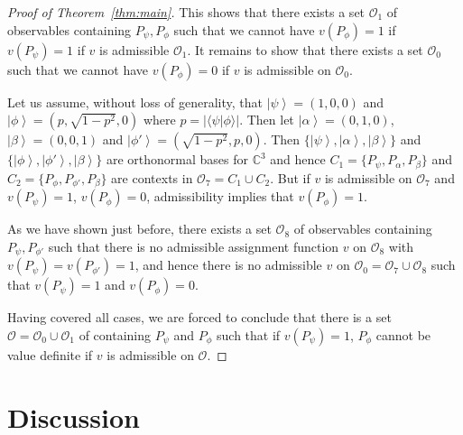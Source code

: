 \documentclass[%
 superscriptaddress,
 preprint,
 showpacs,
 showkeys,
 nofootinbib,
  amsmath,amssymb,
  aps,
  longbibliography,
  floatfix,
 ]{revtex4-1}
\theoremstyle{definition}
\newcommand{\C}{\mathbb{C}}
\newcommand{\ket}[1]{\left| #1 \right>}
\newcommand{\iprod}[2]{\langle #1 | #2 \rangle}
\begin{document}
\begin{proof}[Proof of Theorem~\ref{thm:main}]
	This shows that there exists a set $\mathcal{O}_1$ of observables containing $P_\psi,P_\phi$ such that we cannot have $v(P_\phi)=1$ if $v(P_\psi)=1$ if $v$ is admissible $\mathcal{O}_1$.
	It remains to show that there exists a set $\mathcal{O}_0$ such that we cannot have $v(P_\phi)=0$ if $v$ is admissible on $\mathcal{O}_0$.
	
	Let us assume, without loss of generality, that $\ket{\psi}=(1,0,0)$ and $\ket{\phi}=(p,\sqrt{1-p^2},0)$ where $p=|\iprod{\psi}{\phi}|$.
	Then let $\ket{\alpha}=(0,1,0)$, $\ket{\beta}=(0,0,1)$ and $\ket{\phi'}=(\sqrt{1-p^2},p,0)$.
	Then $\{\ket{\psi},\ket{\alpha},\ket{\beta}\}$ and $\{\ket{\phi},\ket{\phi'},\ket{\beta}\}$ are orthonormal bases for $\C^3$ and hence $C_1=\{P_\psi,P_\alpha,P_\beta\}$ and $C_2=\{P_\phi,P_{\phi'},P_\beta\}$ are contexts in $\mathcal{O}_7=C_1 \cup C_2$.
	But if $v$ is admissible on $\mathcal{O}_7$ and $v(P_\psi)=1$, $v(P_\phi)=0$, admissibility implies that $v(P_\phi)=1$.
	
	As we have shown just before, there exists a set $\mathcal{O}_8$ of observables containing $P_\psi,P_{\phi'}$ such that there is no admissible assignment function $v$ on $\mathcal{O}_8$ with $v(P_\psi)=v(P_{\phi'})=1$, and hence there is no admissible $v$ on $\mathcal{O}_0=\mathcal{O}_7\cup \mathcal{O}_8 $ such that $v(P_\psi)=1$ and $v(P_\phi)=0$.
	
	Having covered all cases, we are forced to conclude that there is a set $\mathcal{O}=\mathcal{O}_0\cup \mathcal{O}_1$ of containing $P_\psi$ and $P_\phi$ such that if $v(P_\psi)=1$, $P_\phi$ cannot be value definite if $v$ is admissible on $\mathcal{O}$.
\end{proof}


\section{Discussion}
\end{document}
